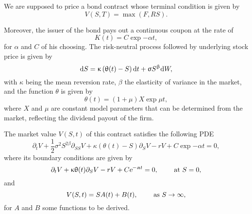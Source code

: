 \noindent We are supposed to price a bond contract whose terminal condition is given by
\begin{equation}
	V(S,T) = \max \left(F, RS\right).
\end{equation}

Moreover, the issuer of the bond pays out a continuous coupon at the rate of 
\begin{equation}
	K(t) = C \exp{-\alpha t},
\end{equation}
for $\alpha$ and $C$ of his choosing. The risk-neutral process followed by underlying stock price is given by
\begin{equation}
	\text{\rm d} S = \upkappa \left(\uptheta(t)  - S\right)\text{\rm d} t + \upsigma S^\upbeta \text{\rm d} W,
\end{equation}
with $\kappa$ being the mean reversion rate, $\beta$ the elasticity of variance in the market, and the function $\theta$ is given by
\begin{equation}
	\theta(t) = (1+\mu)X\exp{\mu t},
\end{equation}
where $X$ and $\mu$ are constant model parameters that can be determined from the market, reflecting the dividend payout of the firm.

The market value $V(S,t)$ of this contract satisfies the following PDE
\begin{equation}\label{general_pde}
	\partial_t V + \frac{1}{2}\sigma^2 S^{2\beta}\partial_{SS}V + \kappa (\theta(t) - S)\partial_SV - rV + C\exp{-\alpha t} = 0,
\end{equation}
where its boundary conditions are given by
\begin{equation}\label{pde_S0}
	\partial_t V + \upkappa \uptheta(t) \partial_S V - rV + C\text{\sl e}^{-\upalpha t} = 0, \quad\quad \text{ at } S= 0,
\end{equation}
and
\begin{equation}
	V(S,t) = S A(t) + B(t), \quad\quad \text{ as } S\to\infty,
\end{equation}
for $A$ and $B$ some functions to be derived.